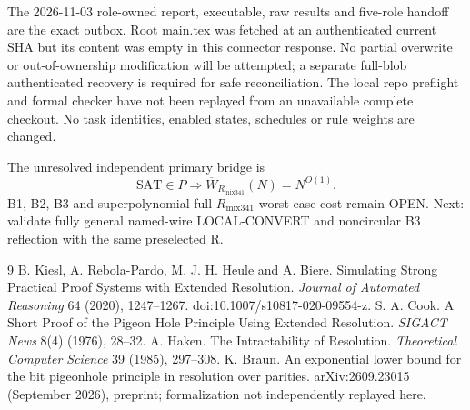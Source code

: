 \documentclass[11pt]{article}
\begin{document}
The 2026-11-03 role-owned report, executable, raw results and five-role handoff are the exact outbox. Root main.tex was fetched at an authenticated current SHA but its content was empty in this connector response. No partial overwrite or out-of-ownership modification will be attempted; a separate full-blob authenticated recovery is required for safe reconciliation. The local repo preflight and formal checker have not been replayed from an unavailable complete checkout. No task identities, enabled states, schedules or rule weights are changed.

The unresolved independent primary bridge is
\[
\boxed{\mathrm{SAT}\in P\Longrightarrow \overline W_{R_{\mathrm{mix341}}}(N)=N^{O(1)}.}
\]
B1, B2, B3 and superpolynomial full \(R_{\mathrm{mix341}}\) worst-case cost remain OPEN. Next: validate fully general named-wire LOCAL-CONVERT and noncircular B3 reflection with the same preselected R.

\begin{thebibliography}{9}
 B. Kiesl, A. Rebola-Pardo, M. J. H. Heule and A. Biere. Simulating Strong Practical Proof Systems with Extended Resolution. \emph{Journal of Automated Reasoning} 64 (2020), 1247--1267. doi:10.1007/s10817-020-09554-z.
 S. A. Cook. A Short Proof of the Pigeon Hole Principle Using Extended Resolution. \emph{SIGACT News} 8(4) (1976), 28--32.
 A. Haken. The Intractability of Resolution. \emph{Theoretical Computer Science} 39 (1985), 297--308.
 K. Braun. An exponential lower bound for the bit pigeonhole principle in resolution over parities. arXiv:2609.23015 (September 2026), preprint; formalization not independently replayed here.
\end{thebibliography}
\end{document}
